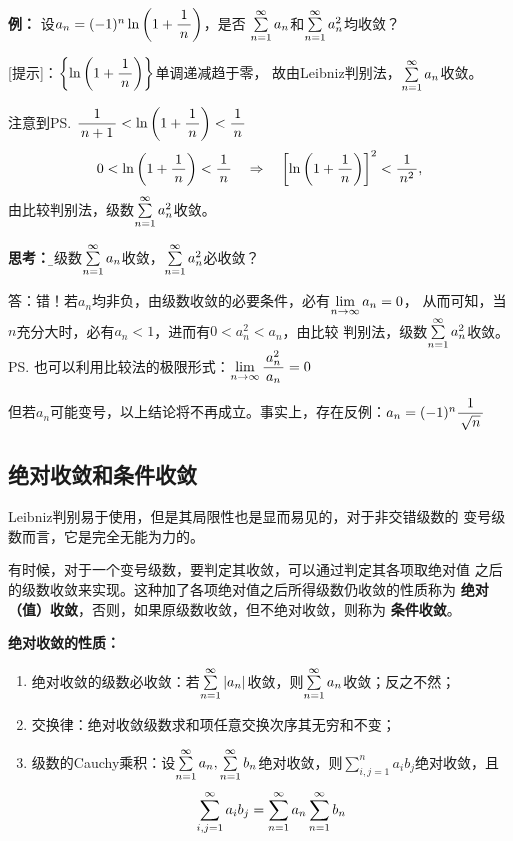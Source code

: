 {\bf 例：} 设$a_n=(-1)^n\ln\left(1+\df1n\right)$，是否 
$\sumn a_n$和$\sumn a^2_n$均收敛？

[提示]：$\left\{\ln\left(1+\df1n\right)\right\}$单调递减趋于零，
故由Leibniz判别法，$\sumn a_n$收敛。

注意到\ps{$\df1{n+1}<\ln\left(1+\df1n\right)<\df1n$}
$$0<\ln\left(1+\df1n\right)<\df1n\quad\Rightarrow\quad
\left[\ln\left(1+\df1n\right)\right]^2<\df1{n^2},$$
由比较判别法，级数$\sumn a^2_n$收敛。

{\bf 思考：}{\b 若级数$\sumn a_n$收敛，$\sumn a^2_n$必收敛？}

答：错！若$a_n$均非负，由级数收敛的必要条件，必有$\limn a_n=0$，
从而可知，当$n$充分大时，必有$a_n<1$，进而有$0<a^2_n<a_n$，由比较
判别法，级数$\sumn a^2_n$收敛。\ps{也可以利用比较法的极限形式：$\limn\df{a^2_n}{a_n}=0$}

但若$a_n$可能变号，以上结论将不再成立。事实上，存在反例：$a_n=(-1)^n\df1{\sqrt n}$

% 

\subsection{绝对收敛和条件收敛}

Leibniz判别易于使用，但是其局限性也是显而易见的，对于非交错级数的
变号级数而言，它是完全无能为力的。

有时候，对于一个变号级数，要判定其收敛，可以通过判定其各项取绝对值
之后的级数收敛来实现。这种加了各项绝对值之后所得级数仍收敛的性质称为
{\bf 绝对（值）收敛}，否则，如果原级数收敛，但不绝对收敛，则称为
{\bf 条件收敛}。

\begin{thx}
	{\bf 绝对收敛的性质：}
	\begin{enumerate}
	  \item {\kaishu 绝对收敛的级数必收敛：}若$\sumn |a_n|$收敛，则$\sumn a_n$收敛；反之不然；
	  \item {\kaishu 交换律：}绝对收敛级数求和项任意交换次序其无穷和不变；
	  \item {\kaishu 级数的Cauchy乘积：}设$\sumn a_n,\sumn
	  b_n$绝对收敛，则$\sum\limits_{i,j=1}^na_ib_j$绝对收敛，且
	  $$\sum\limits_{i,j=1}^{\infty}a_ib_j=\sumn a_n\sumn b_n$$
	\end{enumerate}
\end{thx}

